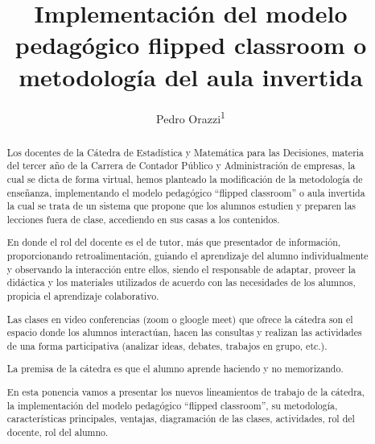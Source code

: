\documentclass[oneside,spanish]{amsart}
\numberwithin{equation}{section}
\numberwithin{figure}{section}
\theoremstyle{definition}
\begin{document}
	
\title[Implementación del modelo pedagógico flipped classroom o metodología del aula invertida]{Implementación del modelo pedagógico flipped classroom o metodología del aula invertida\vspace{-2ex}}
\author[1]{Pedro Orazzi\textsuperscript{1}}
\address[1]{Facultad de Arquitectura y Urbanismo, Universidad Nacional de La Plata}

\begin{abstract}
	Los docentes de la Cátedra de Estadística y Matemática para las Decisiones, materia del tercer año de la Carrera de Contador Público y Administración de empresas, la cual se dicta de forma virtual, hemos planteado la modificación de la metodología de enseñanza, implementando el modelo pedagógico “flipped classroom” o aula invertida la cual se trata de un sistema que propone que los alumnos estudien y preparen las lecciones fuera de clase, accediendo en sus casas a los contenidos.
	
	En donde el rol del docente es el de tutor, más que presentador de información, proporcionando retroalimentación, guiando el aprendizaje del alumno individualmente y observando la interacción entre ellos, siendo el responsable de adaptar, proveer la didáctica y los materiales utilizados de acuerdo con las necesidades de los alumnos, propicia el aprendizaje colaborativo.
	
	Las clases en video conferencias (zoom o gloogle meet) que ofrece la cátedra son el espacio donde los alumnos interactúan, hacen las consultas y realizan las actividades de una forma participativa (analizar ideas, debates, trabajos en grupo, etc.). 
	
	La premisa de la cátedra es que el alumno aprende haciendo y no memorizando.
	
	En esta ponencia vamos a presentar los nuevos lineamientos de trabajo de la cátedra, la implementación del modelo pedagógico “flipped classroom”, su metodología, características principales, ventajas, diagramación de las clases, actividades, rol del docente, rol del alumno.
	
\end{abstract}

\maketitle
\thispagestyle{empty}
\end{document}
